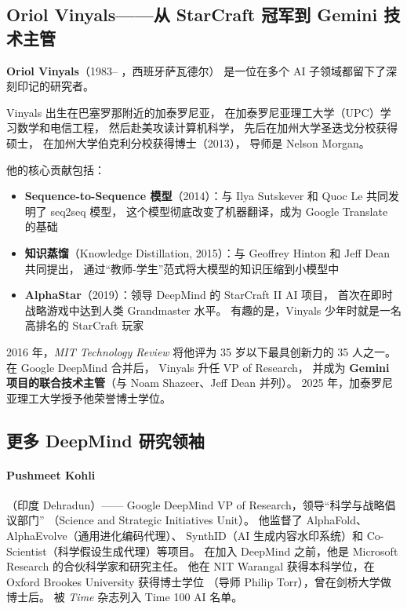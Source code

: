 \subsection{Oriol Vinyals——从 StarCraft 冠军到 Gemini 技术主管}
\label{subsec:vinyals}

\noindent\textbf{Oriol Vinyals}（1983-- ，西班牙萨瓦德尔）
是一位在多个 AI 子领域都留下了深刻印记的研究者。

Vinyals 出生在巴塞罗那附近的加泰罗尼亚，
在加泰罗尼亚理工大学（UPC）学习数学和电信工程，
然后赴美攻读计算机科学，
先后在加州大学圣迭戈分校获得硕士，
在加州大学伯克利分校获得博士（2013），
导师是 Nelson Morgan。

他的核心贡献包括：

\begin{itemize}[noitemsep]
  \item \textbf{Sequence-to-Sequence 模型}（2014）：与 Ilya Sutskever 和 Quoc Le
        共同发明了 seq2seq 模型，
        这个模型彻底改变了机器翻译，成为 Google Translate 的基础
  \item \textbf{知识蒸馏}（Knowledge Distillation, 2015）：与 Geoffrey Hinton 和
        Jeff Dean 共同提出，
        通过``教师-学生''范式将大模型的知识压缩到小模型中
  \item \textbf{AlphaStar}（2019）：领导 DeepMind 的 StarCraft II AI 项目，
        首次在即时战略游戏中达到人类 Grandmaster 水平。
        有趣的是，Vinyals 少年时就是一名高排名的 StarCraft 玩家
\end{itemize}

2016 年，\textit{MIT Technology Review} 将他评为 35 岁以下最具创新力的 35 人之一。
在 Google DeepMind 合并后，
Vinyals 升任 VP of Research，
并成为 \textbf{Gemini 项目的联合技术主管}（与 Noam Shazeer、Jeff Dean 并列）。
2025 年，加泰罗尼亚理工大学授予他荣誉博士学位。


\subsection{更多 DeepMind 研究领袖}
\label{subsec:deepmind-others}

\paragraph{Pushmeet Kohli}（印度 Dehradun）——
Google DeepMind VP of Research，领导``科学与战略倡议部门''
（Science and Strategic Initiatives Unit）。
他监督了 AlphaFold、AlphaEvolve（通用进化编码代理）、
SynthID（AI 生成内容水印系统）和 Co-Scientist（科学假设生成代理）等项目。
在加入 DeepMind 之前，他是 Microsoft Research 的合伙科学家和研究主任。
他在 NIT Warangal 获得本科学位，在 Oxford Brookes University 获得博士学位
（导师 Philip Torr），曾在剑桥大学做博士后。
被 \textit{Time} 杂志列入 Time 100 AI 名单。

